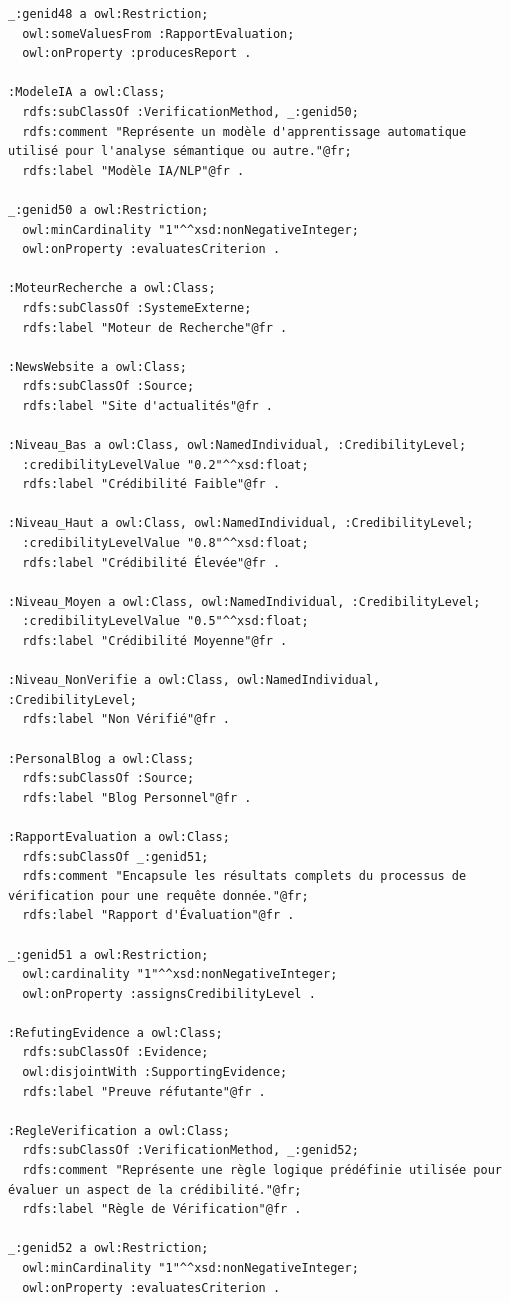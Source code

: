 \documentclass[9pt,twocolumn,french]{article}
\begin{document}
\begin{lstlisting}[language=Turtle,basicstyle=\ttfamily\tiny,frame=single]
_:genid48 a owl:Restriction;
  owl:someValuesFrom :RapportEvaluation;
  owl:onProperty :producesReport .

:ModeleIA a owl:Class;
  rdfs:subClassOf :VerificationMethod, _:genid50;
  rdfs:comment "Représente un modèle d'apprentissage automatique utilisé pour l'analyse sémantique ou autre."@fr;
  rdfs:label "Modèle IA/NLP"@fr .

_:genid50 a owl:Restriction;
  owl:minCardinality "1"^^xsd:nonNegativeInteger;
  owl:onProperty :evaluatesCriterion .

:MoteurRecherche a owl:Class;
  rdfs:subClassOf :SystemeExterne;
  rdfs:label "Moteur de Recherche"@fr .

:NewsWebsite a owl:Class;
  rdfs:subClassOf :Source;
  rdfs:label "Site d'actualités"@fr .

:Niveau_Bas a owl:Class, owl:NamedIndividual, :CredibilityLevel;
  :credibilityLevelValue "0.2"^^xsd:float;
  rdfs:label "Crédibilité Faible"@fr .

:Niveau_Haut a owl:Class, owl:NamedIndividual, :CredibilityLevel;
  :credibilityLevelValue "0.8"^^xsd:float;
  rdfs:label "Crédibilité Élevée"@fr .

:Niveau_Moyen a owl:Class, owl:NamedIndividual, :CredibilityLevel;
  :credibilityLevelValue "0.5"^^xsd:float;
  rdfs:label "Crédibilité Moyenne"@fr .

:Niveau_NonVerifie a owl:Class, owl:NamedIndividual, :CredibilityLevel;
  rdfs:label "Non Vérifié"@fr .

:PersonalBlog a owl:Class;
  rdfs:subClassOf :Source;
  rdfs:label "Blog Personnel"@fr .

:RapportEvaluation a owl:Class;
  rdfs:subClassOf _:genid51;
  rdfs:comment "Encapsule les résultats complets du processus de vérification pour une requête donnée."@fr;
  rdfs:label "Rapport d'Évaluation"@fr .

_:genid51 a owl:Restriction;
  owl:cardinality "1"^^xsd:nonNegativeInteger;
  owl:onProperty :assignsCredibilityLevel .

:RefutingEvidence a owl:Class;
  rdfs:subClassOf :Evidence;
  owl:disjointWith :SupportingEvidence;
  rdfs:label "Preuve réfutante"@fr .

:RegleVerification a owl:Class;
  rdfs:subClassOf :VerificationMethod, _:genid52;
  rdfs:comment "Représente une règle logique prédéfinie utilisée pour évaluer un aspect de la crédibilité."@fr;
  rdfs:label "Règle de Vérification"@fr .

_:genid52 a owl:Restriction;
  owl:minCardinality "1"^^xsd:nonNegativeInteger;
  owl:onProperty :evaluatesCriterion .


\end{lstlisting}
\end{document}
